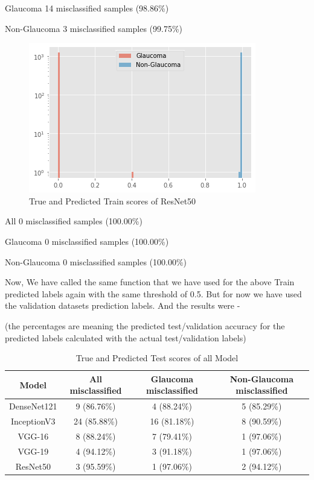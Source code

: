 Glaucoma  14 misclassified samples (98.86\%)

Non-Glaucoma   3 misclassified samples (99.75\%)

\vspace{5mm}
\begin{figure}[hbt!]
\centering
\includegraphics[scale=0.75]{images/fig-40.png}
\caption{True and Predicted Train scores of ResNet50}
\label{fig:x True and Predicted Train scores of ResNet50}
\end{figure}

\newpage

All    0 misclassified samples (100.00\%)

Glaucoma   0 misclassified samples (100.00\%)

Non-Glaucoma   0 misclassified samples (100.00\%)

\vspace{5mm}
Now, We have called the same function that we have used for the above Train predicted labels again with the same threshold of 0.5. But for now we have used the validation datasets prediction labels. And the results were - 

(the percentages are meaning the predicted test/validation accuracy for the predicted labels calculated with the actual test/validation labels)

\begin{table}[hbt!]
\begin{tabular}{|c | c | c| c |}
\hline
Model & All misclassified & Glaucoma misclassified & Non-Glaucoma misclassified\\
\hline
DenseNet121 & 9 (86.76\%) & 4 (88.24\%) &  5 (85.29\%)\\
\hline
InceptionV3 & 24 (85.88\%) & 16 (81.18\%) & 8 (90.59\%)\\
\hline
VGG-16 & 8 (88.24\%) & 7 (79.41\%) & 1 (97.06\%)\\
\hline
VGG-19 & 4 (94.12\%) & 3 (91.18\%) & 1 (97.06\%)\\
\hline
ResNet50 & 3 (95.59\%) & 1 (97.06\%) & 2 (94.12\%)\\
\hline

\end{tabular}
\caption{True and Predicted Test scores of all Model}
\label{tab:True and Predicted Test scores of all Model}
\end{table}

